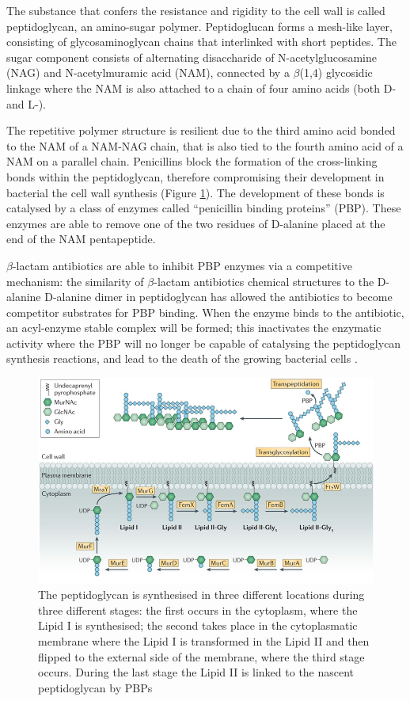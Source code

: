 \documentclass[11pt]{report}
\begin{document}
The substance that confers the resistance and rigidity to the cell wall is called peptidoglycan, an amino-sugar polymer.
Peptidoglucan forms a mesh-like layer, consisting of glycosaminoglycan chains that interlinked with short peptides.
The sugar component consists of alternating disaccharide of N-acetylglucosamine (NAG) and N-acetylmuramic acid (NAM), connected by a $\beta$(1,4) glycosidic linkage where the NAM is also attached to a chain of four amino acids (both D- and L-).

The repetitive polymer structure is resilient due to the third amino acid bonded to the NAM of a NAM-NAG chain, that is also tied to the fourth amino acid of a NAM on a parallel chain.
Penicillins block the formation of the cross-linking bonds within the peptidoglycan, therefore compromising their development in bacterial the cell wall synthesis (Figure \ref{pept}).
The development of these bonds is catalysed by a class of enzymes called “penicillin binding proteins” (PBP).
These enzymes are able to remove one of the two residues of D-alanine placed at the end of the NAM pentapeptide.

$\beta$-lactam antibiotics are able to inhibit PBP enzymes via a competitive mechanism: the similarity of $\beta$-lactam antibiotics chemical structures to the D-alanine D-alanine dimer in peptidoglycan has allowed the antibiotics to become competitor substrates for PBP binding.
When the enzyme binds to the antibiotic, an acyl-enzyme stable complex will be formed; this inactivates the enzymatic activity where the PBP will no longer be capable of catalysing the peptidoglycan synthesis reactions, and lead to the death of the growing bacterial cells \cite{kong2010beta}.

\clearpage
\begin{figure}[htp]
\centering
\includegraphics[scale=0.50]{img/Peptidoglycan.jpg}
\caption{The peptidoglycan is synthesised in three different locations during three different stages: the first occurs in the cytoplasm, where the Lipid I is synthesised; the second takes place in the cytoplasmatic membrane where the Lipid I is transformed in the Lipid II and then flipped to the external side of the membrane, where the third stage occurs. During the last stage the Lipid II is linked to the nascent peptidoglycan by PBPs \cite{Pinho2013}}
\label{pept}
\end{figure}
\end{document}
